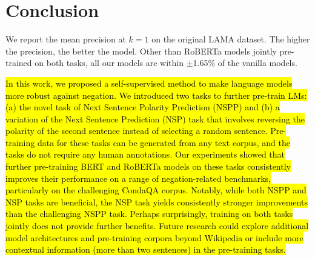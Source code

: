 \section{Conclusion}
\begin{table}
    \centering
    
    \caption{
      We report the mean precision at $k = 1$ on the original LAMA dataset.
      The higher the precision, the better the model.
      Other than {RoBERTa} models jointly pre-trained on both tasks, 
      all our models are within $\pm$1.65\% of the vanilla models. 
      \label{tab:ori-lama-results}
    }
  \end{table}
\hl{In this work,
we proposed a self-supervised method to make language models more robust against negation.
We introduced two tasks to further pre-train LMs:
(a) the novel task of Next Sentence Polarity Prediction (NSPP)
and (b) a variation of the Next Sentence Prediction (NSP) task that involves reversing the polarity of the second sentence instead of selecting a random sentence.
Pre-training data for these tasks can be generated from any text corpus,
and the tasks do not require any human annotations.
Our experiments showed that further pre-training BERT and RoBERTa models
on these tasks consistently improves their performance on a range of negation-related benchmarks,
particularly on the challenging CondaQA corpus.
Notably, while both NSPP and NSP tasks are beneficial,
the NSP task yields consistently stronger improvements than the challenging NSPP task.
Perhaps surprisingly, training on both tasks jointly does not provide further benefits.
Future research could explore additional model architectures and pre-training corpora beyond Wikipedia
or include more contextual information (more than two sentences) in the pre-training tasks.}